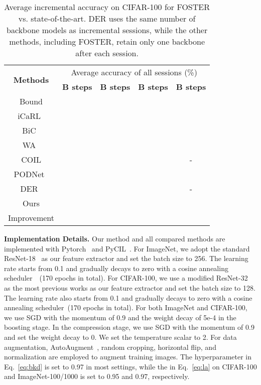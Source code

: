 \documentclass[runningheads]{llncs}
\begin{document}
\begin{table*}[t]
\caption{\small  Average incremental accuracy on CIFAR-100 for FOSTER vs. state-of-the-art. DER uses the same number of backbone models as incremental sessions, while the other methods, including FOSTER, retain only one backbone after each session.}
\label{tab:cifar100}
\centering
\setlength{\tabcolsep}{2mm}
\begin{tabular}{ccccc} 
\hline
\multirow{2}{*}{\textbf{Methods}} & \multicolumn{4}{c}{Average accuracy of all sessions  (\%)}                                                                                                      \\ 
\cline{2-5}
                                  & \textbf{B  steps}       & \textbf{B  steps}                        & \textbf{B  steps}       &  \textbf{B  steps}         \\ 
\hline
Bound                             &                          &                                           &                           &                            \\ 
\hline
iCaRL~\cite{icarl}    &   &   &  & \\
BiC~\cite{bic}      &   &   &   &  \\
WA~\cite{WA}       &   &   &   & \\
COIL\cite{zhou2021co} &  &  &  & - \\
PODNet~\cite{douillard2020podnet}   &   &   &    & \\
DER~\cite{der}     &  &   &   & -\\
\hline
Ours      & & &  &  \\ 
Improvement            &  &  &  &  \\ \hline
\end{tabular}
\end{table*}
\noindent\textbf{Implementation Details.}
Our method and all compared methods are implemented with Pytorch~\cite{pytorch} and PyCIL~\cite{zhou2021pycil}. For ImageNet, we adopt the standard ResNet-18~\cite{resnet} as our feature extractor and set the batch size to 256. The learning rate starts from 0.1 and gradually decays to zero with a cosine annealing scheduler~\cite{loshchilov2016sgdr}~(170 epochs in total). For CIFAR-100, we use a modified ResNet-32~\cite{icarl} as the most previous works as our feature extractor and set the batch size to 128. The learning rate also starts from 0.1 and gradually decays to zero with a cosine annealing scheduler~(170 epochs in total). For both ImageNet and CIFAR-100, we use SGD with the momentum of 0.9 and the weight decay of 5e-4 in the boosting stage. In the compression stage, we use SGD with the momentum of 0.9 and set the weight decay to 0. We set the temperature scalar  to 2. For data augmentation, AutoAugment~\cite{cubuk2019autoaugment}, random cropping, horizontal flip, and normalization are employed to augment training images. The hyperparameter  in Eq.~\ref{eq:bkd} is set to 0.97 in most settings, while the  in Eq.~\ref{eq:la} on CIFAR-100 and ImageNet-100/1000 is set to 0.95 and 0.97, respectively. 
\end{document}
